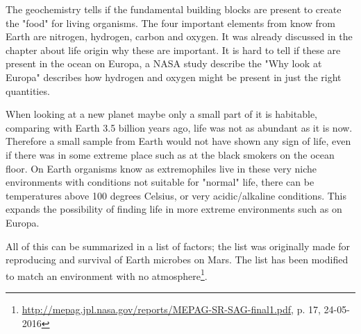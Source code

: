 The geochemistry tells if the fundamental building blocks are present to create the "food" for living organisms. The four important elements from know from Earth are nitrogen, hydrogen, carbon and oxygen. It was already discussed in the chapter about life origin why these are important.  It is hard to tell if these are present in the ocean on Europa, a NASA study describe the "Why look at Europa" describes how hydrogen and oxygen might be present in just the right quantities.

When looking at a new planet maybe only a small part of it is habitable, comparing with Earth 3.5 billion years ago, life was not as abundant as it is now. Therefore a small sample from Earth would not have shown any sign of life, even if there was in some extreme place such as at the black smokers on the ocean floor. On Earth organisms know as extremophiles live in these very niche environments with conditions not suitable for "normal" life, there can be temperatures above 100 degrees Celsius, or very acidic/alkaline conditions. This expands the possibility of finding life in more extreme environments such as on Europa.

All of this can be summarized in a list of factors; the list was originally made for reproducing and survival of Earth microbes on Mars. The list has been modified to match an environment with no atmosphere\footnote{\url{http://mepag.jpl.nasa.gov/reports/MEPAG-SR-SAG-final1.pdf}, p. 17, 24-05-2016}.

